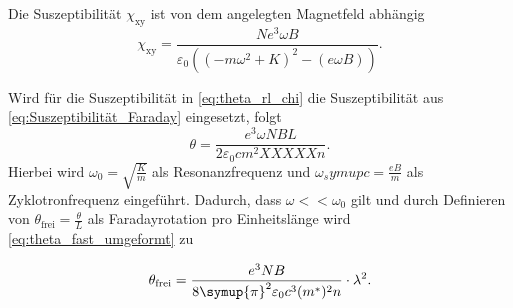 Die Suszeptibilität $\chi_\text{xy}$ ist von dem angelegten Magnetfeld abhängig
\begin{equation}
    \chi_\text{xy} = \frac{Ne^3\omega B}{\varepsilon_0\left(\left(-m\omega^2+K\right)^2-\left(e\omega B\right)\right)}.
    \label{eq:Suszeptibilität_Faraday}
\end{equation}

Wird für die Suszeptibilität in \eqref{eq:theta_rl_chi} die Suszeptibilität aus \eqref{eq:Suszeptibilität_Faraday} eingesetzt, folgt
\begin{equation}
    \theta = \frac{e^3\omega NBL} {2\varepsilon_0 cm^2XXXXXn}. %
    \label{eq:theta_fast_umgeformt}
\end{equation}
Hierbei wird $\omega_0 = \sqrt{\frac{K}{m}}$ als Resonanzfrequenz und $\omega_symup{c} = \frac{eB}{m}$ als Zyklotronfrequenz eingeführt. Dadurch, dass $\omega << \omega_0$ gilt
und durch Definieren von $\theta_\text{frei} = \frac{\theta}{L}$ als Faradayrotation pro Einheitslänge wird \eqref{eq:theta_fast_umgeformt} zu

\begin{equation}
    \label{eqn:theta_l2}
    \theta_\text{frei} = \frac{e^3 N B}{8\symup{\pi}^2 \varepsilon_0 c^3 (m^*)^2 n} \cdot \lambda^2.
\end{equation}
